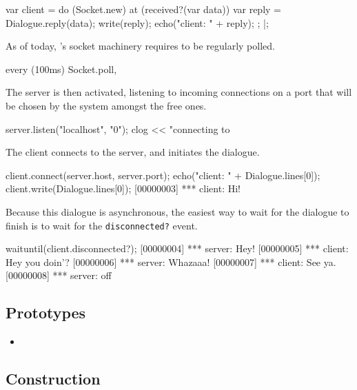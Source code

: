 \begin{urbiscript}
var client =
  do (Socket.new)
  {
    at (received?(var data))
    {
      var reply = Dialogue.reply(data);
      write(reply);
      echo("client: " + reply);
    };
  }|;
\end{urbiscript}

As of today, \us's socket machinery requires to be regularly polled.

\begin{urbiscript}
every (100ms)
  Socket.poll,
\end{urbiscript}

The server is then activated, listening to incoming connections on a
port that will be chosen by the system amongst the free ones.

\begin{urbiscript}
server.listen("localhost", "0");
clog << "connecting to %
\end{urbiscript}

The client connects to the server, and initiates the dialogue.

\begin{urbiscript}
client.connect(server.host, server.port);
echo("client: " + Dialogue.lines[0]);
client.write(Dialogue.lines[0]);
[00000003] *** client: Hi!
\end{urbiscript}

Because this dialogue is asynchronous, the easiest way to wait for the
dialogue to finish is to wait for the \lstinline|disconnected?| event.

\begin{urbiscript}
waituntil(client.disconnected?);
[00000004] *** server: Hey!
[00000005] *** client: Hey you doin'?
[00000006] *** server: Whazaaa!
[00000007] *** client: See ya.
[00000008] *** server: off
\end{urbiscript}

\subsection{Prototypes}
\begin{itemize}
\item {}
\end{itemize}

\subsection{Construction}

